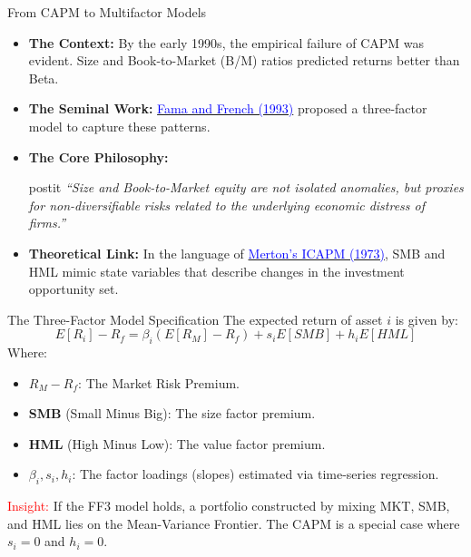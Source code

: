 \documentclass{beamer}
\begin{document}
\begin{frame}{From CAPM to Multifactor Models}
	\begin{itemize}
		\item \textbf{The Context:} By the early 1990s, the empirical failure of CAPM was evident. Size and Book-to-Market (B/M) ratios predicted returns better than Beta.
		\item \textbf{The Seminal Work:} \href{https://www.sciencedirect.com/science/article/pii/0304405X93900235}{\textcolor{blue}{Fama and French (1993)}} proposed a three-factor model to capture these patterns.
		\item \textbf{The Core Philosophy:}\\
		\begin{beamercolorbox}[sep=0em,wd=\linewidth,rounded=true,shadow=true]{postit}
        \textit{``Size and Book-to-Market equity are not isolated anomalies, but proxies for non-diversifiable risks related to the underlying economic distress of firms.''}
    \end{beamercolorbox}
		\item \textbf{Theoretical Link:} In the language of \href{https://doi.org/10.2307/1913811}{\textcolor{blue}{Merton's ICAPM (1973)}}, SMB and HML mimic state variables that describe changes in the investment opportunity set.
	\end{itemize}
\end{frame}

\begin{frame}{The Three-Factor Model Specification}
	The expected return of asset $i$ is given by:
	\begin{equation}
		E[R_{i}] - R_f = \beta_{i}(E[R_{M}] - R_{f}) + s_{i} E[SMB] + h_{i} E[HML]
	\end{equation}
	Where:
	\begin{itemize}
		\item $R_M - R_f$: The Market Risk Premium.
		\item \textbf{SMB} (Small Minus Big): The size factor premium.
		\item \textbf{HML} (High Minus Low): The value factor premium.
		\item $\beta_i, s_i, h_i$: The factor loadings (slopes) estimated via time-series regression.
	\end{itemize}
	
	\vspace{0.5cm}
	\footnotesize
	\textcolor{red}{Insight:} If the FF3 model holds, a portfolio constructed by mixing MKT, SMB, and HML lies on the Mean-Variance Frontier. The CAPM is a special case where $s_i = 0$ and $h_i = 0$.
\end{frame}
\end{document}
